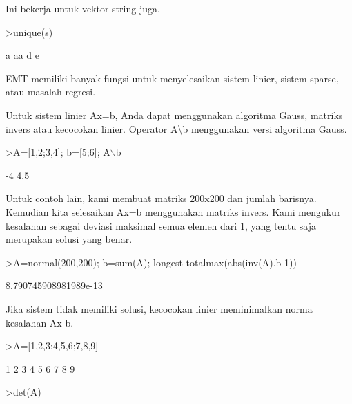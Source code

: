 \documentclass[a4paper,10pt]{article}
\begin{document}
\begin{eulernotebook}
\begin{eulercomment}
\begin{eulercomment}
\begin{eulercomment}
\begin{eulercomment}
\begin{eulercomment}
\begin{eulercomment}
\begin{eulercomment}
Ini bekerja untuk vektor string juga.
\end{eulercomment}
\begin{eulerprompt}
>unique(s)
\end{eulerprompt}
\begin{euleroutput}
  a
  aa
  d
  e
\end{euleroutput}
\begin{eulercomment}
EMT memiliki banyak fungsi untuk menyelesaikan sistem linier, sistem
sparse, atau masalah regresi.

Untuk sistem linier Ax=b, Anda dapat menggunakan algoritma Gauss,
matriks invers atau kecocokan linier. Operator A\textbackslash{}b menggunakan versi
algoritma Gauss.
\end{eulercomment}
\begin{eulerprompt}
>A=[1,2;3,4]; b=[5;6]; A\(\backslash\)b
\end{eulerprompt}
\begin{euleroutput}
             -4 
            4.5 
\end{euleroutput}
\begin{eulercomment}
Untuk contoh lain, kami membuat matriks 200x200 dan jumlah barisnya.
Kemudian kita selesaikan Ax=b menggunakan matriks invers. Kami
mengukur kesalahan sebagai deviasi maksimal semua elemen dari 1, yang
tentu saja merupakan solusi yang benar.
\end{eulercomment}
\begin{eulerprompt}
>A=normal(200,200); b=sum(A); longest totalmax(abs(inv(A).b-1))
\end{eulerprompt}
\begin{euleroutput}
    8.790745908981989e-13 
\end{euleroutput}
\begin{eulercomment}
Jika sistem tidak memiliki solusi, kecocokan linier meminimalkan norma
kesalahan Ax-b.
\end{eulercomment}
\begin{eulerprompt}
>A=[1,2,3;4,5,6;7,8,9]
\end{eulerprompt}
\begin{euleroutput}
              1             2             3 
              4             5             6 
              7             8             9 
\end{euleroutput}
\begin{eulerprompt}
>det(A)
\end{eulerprompt}
\begin{euleroutput}

\end{euleroutput}
\end{eulercomment}
\end{eulercomment}
\end{eulercomment}
\end{eulercomment}
\end{eulercomment}
\end{eulercomment}
\end{eulernotebook}
\end{document}
